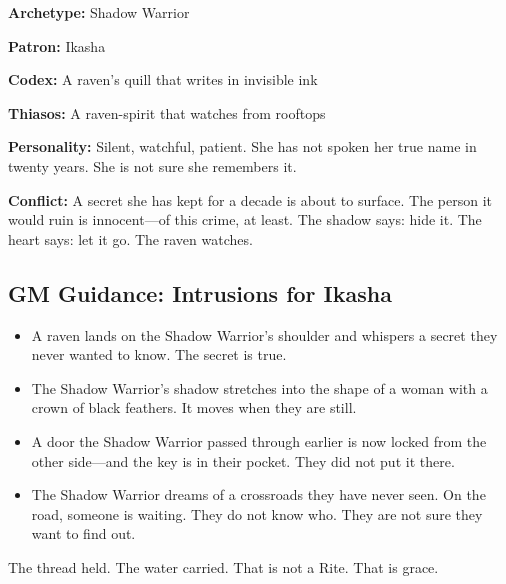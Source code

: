 \textbf{Archetype:} Shadow Warrior

\textbf{Patron:} Ikasha

\textbf{Codex:} A raven's quill that writes in invisible ink

\textbf{Thiasos:} A raven-spirit that watches from rooftops

\textbf{Personality:} Silent, watchful, patient. She has not spoken her true name in twenty years. She is not sure she remembers it.

\textbf{Conflict:} A secret she has kept for a decade is about to surface. The person it would ruin is innocent—of this crime, at least. The shadow says: hide it. The heart says: let it go. The raven watches.

\subsection{GM Guidance: Intrusions for Ikasha}

\begin{itemize}
\item A raven lands on the Shadow Warrior's shoulder and whispers a secret they never wanted to know. The secret is true.
\item The Shadow Warrior's shadow stretches into the shape of a woman with a crown of black feathers. It moves when they are still.
\item A door the Shadow Warrior passed through earlier is now locked from the other side—and the key is in their pocket. They did not put it there.
\item The Shadow Warrior dreams of a crossroads they have never seen. On the road, someone is waiting. They do not know who. They are not sure they want to find out.
\end{itemize}

The thread held. The water carried. That is not a Rite. That is grace.
